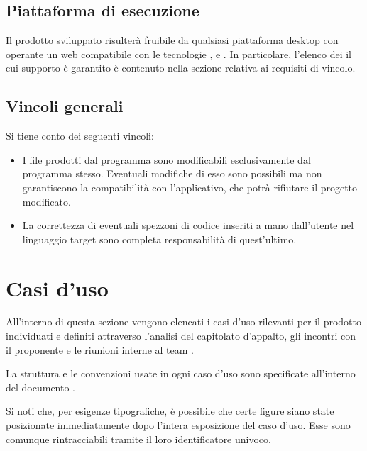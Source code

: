 	\subsection{Piattaforma di esecuzione}
	Il prodotto sviluppato risulterà fruibile da qualsiasi piattaforma desktop con operante un  web compatibile con le tecnologie ,  e . In particolare, l'elenco dei  il cui supporto è garantito è contenuto nella sezione relativa ai requisiti di vincolo.
\subsection{Vincoli generali}
    Si tiene conto dei seguenti vincoli:
    \begin{itemize}
    	\item I file prodotti dal programma sono modificabili esclusivamente dal programma stesso. Eventuali modifiche di esso sono possibili ma non garantiscono la compatibilità con l'applicativo, che potrà rifiutare il progetto modificato.
    	\item La correttezza di eventuali spezzoni di codice inseriti a mano dall'utente nel linguaggio target sono completa responsabilità di quest'ultimo.
    \end{itemize}	



\section{Casi d'uso}
All'interno di questa sezione vengono elencati i casi d'uso rilevanti per il prodotto \proj{} individuati e definiti attraverso l'analisi del capitolato d'appalto, gli incontri con il proponente e le riunioni interne al team \hx{}. 

La struttura e le convenzioni usate in ogni caso d'uso sono specificate all'interno del documento \NdP.

Si noti che, per esigenze tipografiche, è possibile che certe figure siano state posizionate immediatamente dopo l'intera esposizione del caso d'uso. Esse sono comunque rintracciabili tramite il loro identificatore univoco.

